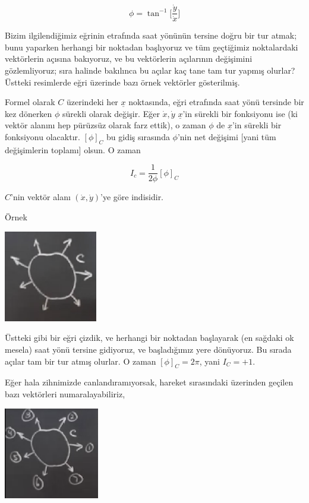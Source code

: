 \documentclass[12pt,fleqn]{article}\usepackage{../../common}
\begin{document}
$$ \phi = \tan^{-1} \bigg[ \frac{\dot{y}}{\dot{x}} \bigg] $$

Bizim ilgilendiğimiz eğrinin etrafında saat yönünün tersine doğru bir tur atmak;
bunu yaparken herhangi bir noktadan başlıyoruz ve tüm geçtiğimiz noktalardaki
vektörlerin açısına bakıyoruz, ve bu vektörlerin açılarının değişimini
gözlemliyoruz; sıra halinde bakılınca bu açılar kaç tane tam tur yapmış olurlar?
Üstteki resimlerde eğri üzerinde bazı örnek vektörler gösterilmiş. 

Formel olarak $C$ üzerindeki her $\underline{x}$ noktasında, eğri etrafında saat
yönü tersinde bir kez dönerken $\phi$ sürekli olarak değişir. Eğer
$\dot{x},\dot{y}$ $\underline{x}$'in sürekli bir fonksiyonu ise (ki vektör
alanını hep pürüzsüz olarak farz ettik), o zaman $\phi$ de $\underline{x}$'in
sürekli bir fonksiyonu olacaktır. $[\phi]_C$ bu gidiş sırasında $\phi$'nin net
değişimi [yani tüm değişimlerin toplamı] olsun. O zaman

$$ I_c = \frac{1}{2\phi} [\phi]_C $$

$C$'nin vektör alanı $(\dot{x},\dot{y})$'ye göre indisidir. 

Örnek

\includegraphics[height=4cm]{08_13.png}

Üstteki gibi bir eğri çizdik, ve herhangi bir noktadan başlayarak (en sağdaki ok
mesela) saat yönü tersine gidiyoruz, ve başladığımız yere dönüyoruz. Bu sırada
açılar tam bir tur atmış olurlar. O zaman $[\phi]_C = 2\pi$, yani $I_C = +1$. 

Eğer hala zihnimizde canlandıramıyorsak, hareket sırasındaki üzerinden geçilen
bazı vektörleri numaralayabiliriz, 

\includegraphics[height=4cm]{08_14.png}
\end{document}
